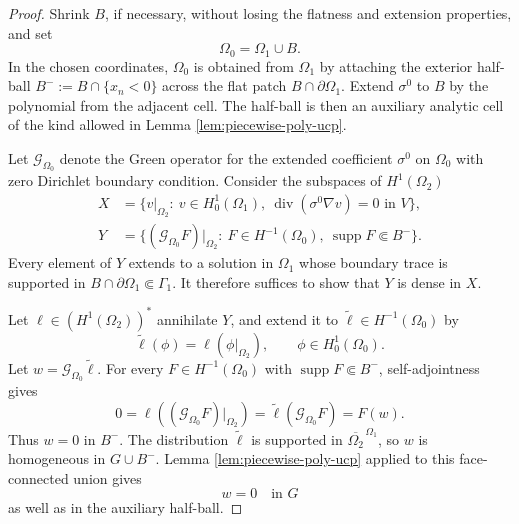 \documentclass[11pt,oneside]{article}
\newcommand{\diver}{\operatorname{div}}
\newcommand{\supp}{\operatorname{supp}}
\begin{document}
\begin{proof}
Shrink \(B\), if necessary, without losing the flatness and extension
properties, and set
\begin{equation}
  \Omega_0=\Omega_1\cup B .
\end{equation}
In the chosen coordinates, \(\Omega_0\) is obtained from \(\Omega_1\) by
attaching the exterior half-ball
\(B^-:=B\cap\{x_n<0\}\) across the flat patch
\(B\cap\partial\Omega_1\).  Extend \(\sigma^0\) to \(B\) by the polynomial from
the adjacent cell.  The half-ball is then an auxiliary analytic cell of the
kind allowed in Lemma \ref{lem:piecewise-poly-ucp}.

Let \(\mathcal G_{\Omega_0}\) denote the Green operator for the extended
coefficient \(\sigma^0\) on \(\Omega_0\) with zero Dirichlet boundary
condition.  Consider the subspaces of \(H^1(\Omega_2)\)
\begin{align}
  X&=\{v|_{\Omega_2}:\ v\in H^1_0(\Omega_1),\
        \diver(\sigma^0\nabla v)=0\text{ in }V\},\\
  Y&=\{(\mathcal G_{\Omega_0}F)|_{\Omega_2}:\ 
        F\in H^{-1}(\Omega_0),\
        \supp F\Subset B^-\}.
\end{align}
Every element of \(Y\) extends to a solution in \(\Omega_1\) whose boundary
trace is supported in \(B\cap\partial\Omega_1\Subset\Gamma_1\).  It therefore
suffices to show that \(Y\) is dense in \(X\).

Let \(\ell\in (H^1(\Omega_2))^*\) annihilate \(Y\), and extend it to
\(\widetilde\ell\in H^{-1}(\Omega_0)\) by
\begin{equation}
  \widetilde\ell(\phi)=\ell(\phi|_{\Omega_2}),
  \qquad \phi\in H^1_0(\Omega_0).
\end{equation}
Let \(w=\mathcal G_{\Omega_0}\widetilde\ell\).  For every
\(F\in H^{-1}(\Omega_0)\) with \(\supp F\Subset B^-\), self-adjointness gives
\begin{equation}
  0=\ell((\mathcal G_{\Omega_0}F)|_{\Omega_2})
   =\widetilde\ell(\mathcal G_{\Omega_0}F)
   =F(w).
\end{equation}
Thus \(w=0\) in \(B^-\).  The distribution \(\widetilde\ell\) is supported in
\(\overline{\Omega_2}^{\,\Omega_1}\), so \(w\) is homogeneous in \(G\cup B^-\).
Lemma \ref{lem:piecewise-poly-ucp} applied to this face-connected union gives
\begin{equation}
  w=0\quad\text{in }G
\end{equation}
as well as in the auxiliary half-ball.


\end{proof}
\end{document}
